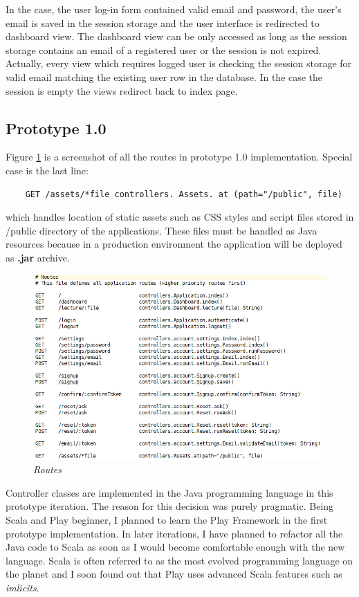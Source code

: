 \documentclass[12pt,twoside,a4paper]{report}
\begin{document}
In the case, the user log-in form contained valid email and password, the user's email is saved in the session storage and the user interface is redirected to dashboard view. The dashboard view can be only accessed as long as the session storage contains an email of a registered user or the session is not expired. Actually, every view which requires logged user is checking the session storage for valid email matching the existing user row in the database. In the case the session is empty the views redirect back to index page.

\subsection{Prototype 1.0}\label{4.5.1}

Figure \ref{f4.5.1.1} is a screenshot of all the routes in prototype 1.0 implementation. Special case is the last line:
\begin{lstlisting} 
	GET /assets/*file controllers. Assets. at (path="/public", file)
\end{lstlisting} 
which handles location of static assets such as CSS styles and script files stored in /public directory of the applications. These files must be handled as Java resources because in a production environment the application will be deployed as \textbf{.jar} archive.

\begin{figure}[!ht]
	\centering
		\includegraphics[width=1\textwidth, totalheight=9cm]
		{routes}
	\caption{\textit{Routes}}
	\label{f4.5.1.1}
\end{figure}

Controller classes are implemented in the Java programming language in this prototype iteration. The reason for this decision was purely pragmatic. Being Scala and Play beginner, I planned to learn the Play Framework in the first prototype implementation. In later iterations, I have planned to refactor all the Java code to Scala as soon as I would become comfortable enough with the new language. Scala is often referred to as the most evolved programming language on the planet and I soon found out that Play uses advanced Scala features such as \emph{imlicits}.
\end{document}
